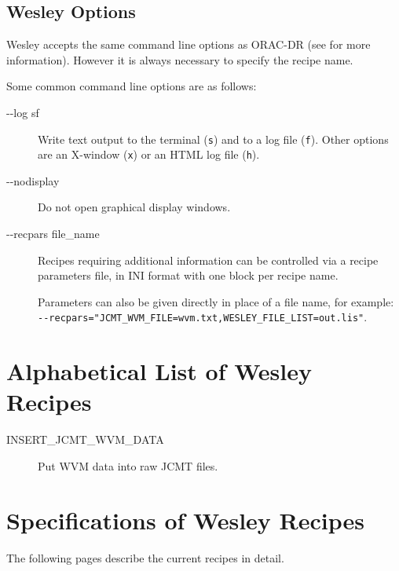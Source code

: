 \documentclass[twoside,11pt,nolof]{starlink}
\begin{document}

\subsection{Wesley Options}

Wesley accepts the same command line options as ORAC-DR
(see \oracdrsun{} for more information).
However it is always necessary to specify the recipe name.

Some common command line options are as follows:

\begin{description}
\item[-{}-log sf] \mbox{}

Write text output to the terminal (\texttt{s}) and to a log file
(\texttt{f}).
Other options are an X-window (\texttt{x}) or an HTML log file (\texttt{h}).

\item[-{}-nodisplay] \mbox{}

Do not open graphical display windows.

\item[-{}-recpars file\_name] \mbox{}

Recipes requiring additional information can be controlled via
a recipe parameters file, in INI format with one block per recipe name.

Parameters can also be given directly in place of a file name,
for example:
\\ \texttt{-{}-recpars="JCMT\_WVM\_FILE=wvm.txt,WESLEY\_FILE\_LIST=out.lis"}.

\end{description}

\newpage
\appendix

\section{Alphabetical List of Wesley Recipes\label{ap:list}}

\begin{description}
\item[INSERT\_JCMT\_WVM\_DATA] \mbox{}
Put WVM data into raw JCMT files.
\end{description}

\newpage

\section{Specifications of Wesley Recipes\label{ap:full}}

The following pages describe the current \wesley{} recipes in detail.


\end{document}
